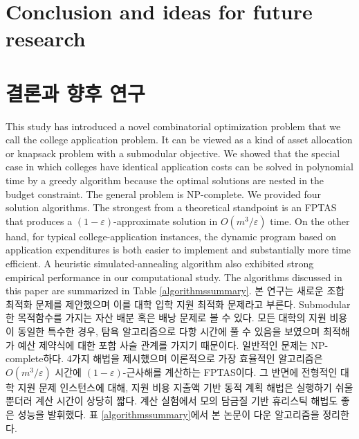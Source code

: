 \documentclass[11pt]{article} %
\theoremstyle{definition}
\theoremstyle{definition}
\begin{document}
\ifen \section{Conclusion and ideas for future research} \else \section{결론과 향후 연구}\fi\label{conclusion}
\ifen
This study has introduced a novel combinatorial optimization problem that we call the college application problem. It can be viewed as a kind of asset allocation or knapsack problem with a submodular objective. We showed that the special case in which colleges have identical application costs can be solved in polynomial time by a greedy algorithm because the optimal solutions are nested in the budget constraint. The general problem is NP-complete. We provided four solution algorithms. The strongest from a theoretical standpoint is an FPTAS that produces a $(1-\varepsilon)$-approximate solution in $O(m^3 / \varepsilon)$ time. On the other hand, for typical college-application instances, the dynamic program based on application expenditures is both easier to implement and substantially more time efficient. A heuristic simulated-annealing algorithm also exhibited strong empirical performance in our computational study. The algorithms discussed in this paper are summarized in Table \ref{algorithmssummary}.
\else
본 연구는 새로운 조합 최적화 문제를 제안했으며 이를 대학 입학 지원 최적화 문제라고 부른다. Submodular한 목적함수를 가지는 자산 배분 혹은 배낭 문제로 볼 수 있다. 모든 대학의 지원 비용이 동일한 특수한 경우, 탐욕 알고리즘으로 다항 시간에 풀 수 있음을 보였으며 최적해가 예산 제약식에 대한 포함 사슬 관계를 가지기 때문이다. 일반적인 문제는 NP-complete하다. 4가지 해법을 제시했으며 이론적으로 가장 효율적인 알고리즘은 $O(m^3 / \varepsilon)$ 시간에  $(1-\varepsilon)$-근사해를 계산하는 FPTAS이다. 그 반면에 전형적인 대학 지원 문제 인스턴스에 대해, 지원 비용 지출액 기반 동적 계획 해법은 실행하기 쉬울뿐더러 계산 시간이 상당히 짧다. 계산 실험에서 모의 담금질 기반 휴리스틱 해법도 좋은 성능을 발휘했다. 표 \ref{algorithmssummary}에서 본 논문이 다운 알고리즘을 정리한다.
\fi
\end{document}
